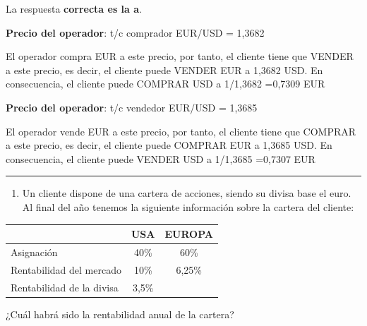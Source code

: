 \documentclass[
  letterpaper,
  DIV=11,
  numbers=noendperiod]{scrreprt}
\providecommand{\tightlist}{%
  \setlength{\itemsep}{0pt}\setlength{\parskip}{0pt}}\usepackage{longtable,booktabs,array}
\begin{document}
\begin{tcolorbox}[enhanced jigsaw, left=2mm, opacityback=0, colback=white, breakable, arc=.35mm, bottomrule=.15mm, rightrule=.15mm, toprule=.15mm, leftrule=.75mm, colframe=quarto-callout-tip-color-frame]
\begin{minipage}[t]{5.5mm}
\textcolor{quarto-callout-tip-color}{\faLightbulb}
\end{minipage}%
\begin{minipage}[t]{\textwidth - 5.5mm}

La respuesta \textbf{correcta es la a}.

\textbf{Precio del operador}: t/c comprador EUR/USD = 1,3682

El operador compra EUR a este precio, por tanto, el cliente tiene que
VENDER a este precio, es decir, el cliente puede VENDER EUR a 1,3682
USD. En consecuencia, el cliente puede COMPRAR USD a 1/1,3682 =0,7309
EUR

\textbf{Precio del operador}: t/c vendedor EUR/USD = 1,3685

El operador vende EUR a este precio, por tanto, el cliente tiene que
COMPRAR a este precio, es decir, el cliente puede COMPRAR EUR a 1,3685
USD. En consecuencia, el cliente puede VENDER USD a 1/1,3685 =0,7307 EUR

\end{minipage}%
\end{tcolorbox}

\begin{center}\rule{0.5\linewidth}{0.5pt}\end{center}

\begin{enumerate}
\def\labelenumi{\arabic{enumi}.}
\setcounter{enumi}{50}
\tightlist
\item
  Un cliente dispone de una cartera de acciones, siendo su divisa base
  el euro. Al final del año tenemos la siguiente información sobre la
  cartera del cliente:
\end{enumerate}

\begin{longtable}[]{@{}lcc@{}}
\toprule()
& USA & EUROPA \\
\midrule()
\endhead
Asignación & 40\% & 60\% \\
Rentabilidad del mercado & 10\% & 6,25\% \\
Rentabilidad de la divisa & 3,5\% & \\
\bottomrule()
\end{longtable}

¿Cuál habrá sido la rentabilidad anual de la cartera?
\end{document}
